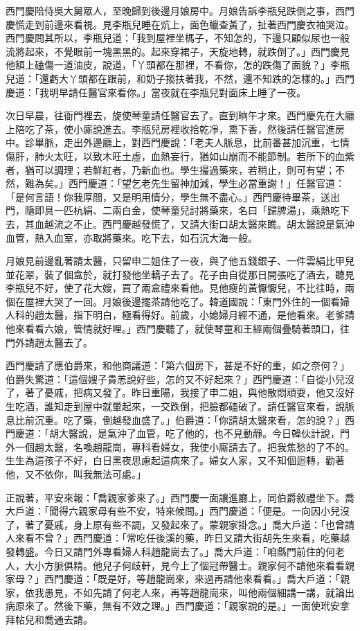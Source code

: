 西門慶陪侍吳大舅眾人，至晚歸到後邊月娘房中。月娘告訴李瓶兒跌倒之事，西門慶慌走到前邊來看視。見李瓶兒睡在炕上，面色蠟查黃了，扯著西門慶衣袖哭泣。西門慶問其所以，李瓶兒道：「我到屋裡坐榪子，不知怎的，下邊只顧似尿也一般流將起來，不覺眼前一塊黑黑的。起來穿裙子，天旋地轉，就跌倒了。」西門慶見他額上磕傷一道油皮，說道，「丫頭都在那裡，不看你，怎的跌傷了面貌？」李瓶兒道：「還虧大丫頭都在跟前，和奶子搊扶著我，不然，還不知跌的怎樣的。」西門慶道：「我明早請任醫官來看你。」當夜就在李瓶兒對面床上睡了一夜。

次日早晨，往衙門裡去，旋使琴童請任醫官去了。直到晌午才來。西門慶先在大廳上陪吃了茶，使小廝說進去。李瓶兒房裡收拾乾凈，熏下香，然後請任醫官進房中。診畢脈，走出外邊廳上，對西門慶說：「老夫人脈息，比前番甚加沉重，七情傷肝，肺火太旺，以致木旺土虛，血熱妄行，猶如山崩而不能節制。若所下的血紫者，猶可以調理；若鮮紅者，乃新血也。學生撮過藥來，若稍止，則可有望；不然，難為矣。」西門慶道：「望乞老先生留神加減，學生必當重謝！」任醫官道： 「是何言語！你我厚間，又是明用情分，學生無不盡心。」西門慶待畢茶，送出門，隨即具一匹杭絹、二兩白金，使琴童兒討將藥來，名曰「歸脾湯」，乘熱吃下去，其血越流之不止。西門慶越發慌了，又請大街口胡太醫來瞧。胡太醫說是氣沖血管，熱入血室，亦取將藥來。吃下去，如石沉大海一般。

月娘見前邊亂著請太醫，只留申二姐住了一夜，與了他五錢銀子、一件雲絹比甲兒並花翠，裝了個盒於，就打發他坐轎子去了。花子由自從那日開張吃了酒去，聽見李瓶兒不好，使了花大嫂，買了兩盒禮來看他。見他瘦的黃懨懨兒，不比往時，兩個在屋裡大哭了一回。月娘後邊擺茶請他吃了。韓道國說：「東門外住的一個看婦人科的趙太醫，指下明白，極看得好。前歲，小媳婦月經不通，是他看來。老爹請他來看看六娘，管情就好哩。」西門慶聽了，就使琴童和王經兩個疊騎著頭口，往門外請趙太醫去了。

西門慶請了應伯爵來，和他商議道：「第六個房下，甚是不好的重，如之奈何？」伯爵失驚道：「這個嫂子貴恙說好些，怎的又不好起來？」西門慶道：「自從小兒沒了，著了憂戚，把病又發了。昨日重陽，我接了申二姐，與他散悶頑耍，他又沒好生吃酒，誰知走到屋中就暈起來，一交跌倒，把臉都磕破了。請任醫官來看，說脈息比前沉重。吃了藥，倒越發血盛了。」伯爵道：「你請胡太醫來看，怎的說？」西門慶道：「胡大醫說，是氣沖了血管，吃了他的，也不見動靜。今日韓伙計說，門外一個趙太醫，名喚趙龍崗，專科看婦女，我使小廝請去了。把我焦愁的了不的。生生為這孩子不好，白日黑夜思慮起這病來了。婦女人家，又不知個迴轉，勸著他，又不依你，叫我無法可處。」

正說著，平安來報：「喬親家爹來了。」西門慶一面讓進廳上，同伯爵敘禮坐下。喬大戶道：「聞得六親家母有些不安，特來候問。」西門慶道：「便是。一向因小兒沒了，著了憂戚，身上原有些不調，又發起來了。蒙親家掛念。」喬大戶道：「也曾請人來看不曾？」西門慶道：「常吃任後溪的藥，昨日又請大街胡先生來看，吃藥越發轉盛。今日又請門外專看婦人科趙龍崗去了。」喬大戶道：「咱縣門前住的何老人，大小方脈俱精。他兒子何歧軒，見今上了個冠帶醫士。親家何不請他來看看親家母？」西門慶道：「既是好，等趙龍崗來，來過再請他來看看。」喬大戶道：「親家，依我愚見，不如先請了何老人來，再等趙龍崗來，叫他兩個細講一講，就論出病原來了。然後下藥，無有不效之理。」西門慶道：「親家說的是。」一面使玳安拿拜帖兒和喬通去請。

